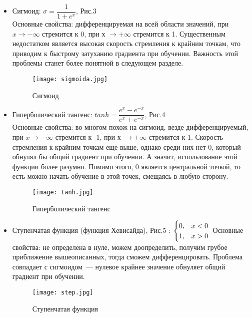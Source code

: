 \documentclass[12pt, a4paper]{article}
\begin{document}
\begin{itemize}
	\item Сигмоид: $\sigma = \dfrac1{1 + e^{x}}$, Рис.3\\

	Основные свойства: дифференцируемая на всей области значений, при $x \rightarrow -\infty$ стремится к 0, при х $\rightarrow +\infty$ стремится к 1. Существенным недостатком является высокая скорость стремления к крайним точкам, что приводим к быстрому затуханию градиента при обучении. Важность этой проблемы станет более понятной в следующем разделе.

	\begin{figure}[ht]
		\centering
		\texttt{[image: sigmoida.jpg]}
		\caption{Сигмоид}
	\end{figure}

	\item Гиперболический тангенс: $tanh = \dfrac{e^{x} - e^{-x}}{e^{x} + e^{-x}}$, Рис.4\\

	Основные свойства: во многом похож на сигмоид, везде дифференцируемый, при $x \rightarrow -\infty$ стремится к -1, при х $\rightarrow +\infty$ стремится к 1. Скорость стремления к крайним точкам еще выше, однако среди них нет 0, который обнулял бы общий градиент при обучении. А значит, использование этой функции более разумно. Помимо этого, 0 является центральной точкой, то есть можно начать обучение в этой точек, смещаясь в любую сторону.

	\begin{figure}[ht]
		\centering
		\texttt{[image: tanh.jpg]}
		\caption{Гиперболический тангенс}
	\end{figure}

	\item Ступенчатая функция (функция Хевисайда), Рис.5 :
$
	\begin{cases}
		0, & x<0 \\
		1, & x>0
	\end{cases}\\
$
	Основные свойства: не определена в нуле, можем доопределить, получим грубое приближение вышеописанных, тогда сможем дифференцировать. Проблема совпадает с сигмоидом~--- нулевое крайнее значение обнуляет общий градиент при обучении.

	\begin{figure}[ht]
		\centering
		\texttt{[image: step.jpg]}
		\caption{Ступенчатая функция}
	\end{figure}


\end{itemize}
\end{document}
